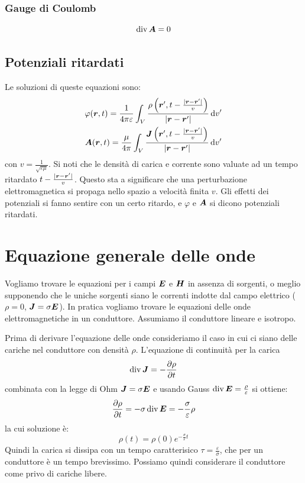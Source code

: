 \subsubsection{Gauge di Coulomb}
\begin{equation}
  \operatorname{div}\boldsymbol{A}=0
\end{equation}


\subsection{Potenziali ritardati}
Le soluzioni di queste equazioni sono:
\begin{gather}
  \varphi(\boldsymbol{r},t)=\frac{1}{4\pi\varepsilon}\int_V\frac{\rho\left(\boldsymbol{r}', t-\frac{|\boldsymbol{r}-\boldsymbol{r}'|}{v}\right)}{|\boldsymbol{r}-\boldsymbol{r}'|}\,\mathrm{d} v'\\
  \boldsymbol{A}(\boldsymbol{r},t)=\frac{\mu}{4\pi}\int_V\frac{\boldsymbol{J}\left(\boldsymbol{r}', t-\frac{|\boldsymbol{r}-\boldsymbol{r}'|}{v}\right)}{|\boldsymbol{r} - \boldsymbol{r}'|}\,\mathrm{d} v'
\end{gather}
con $v=\frac{1}{\sqrt{\varepsilon\mu}}$. Si noti che le densità di carica e corrente sono valuate ad un tempo ritardato $t-\frac{|\boldsymbol{r}-\boldsymbol{r}'|}{v}$. Questo sta a significare che una perturbazione elettromagnetica si propaga nello spazio a velocità finita $v$. Gli effetti dei potenziali si fanno sentire con un certo ritardo, e $\varphi$ e $\boldsymbol{A}$ si dicono potenziali ritardati.
\section{Equazione generale delle onde}
Vogliamo trovare le equazioni per i campi $\boldsymbol{E}$ e $\boldsymbol{H}$ in assenza di sorgenti, o meglio supponendo che le uniche sorgenti siano le correnti indotte dal campo elettrico ($\rho=0$, $\boldsymbol{J}=\sigma\boldsymbol{E}$). In pratica vogliamo trovare le equazioni delle onde elettromagnetiche in un conduttore. Assumiamo il conduttore lineare e isotropo.

Prima di derivare l'equazione delle onde consideriamo il caso in cui ci siano delle cariche nel conduttore con densità $\rho$. L'equazione di continuità per la carica
\[
\operatorname{div} \boldsymbol{J} = -\frac{\partial \rho}{\partial t}
\]
combinata con la legge di Ohm $\boldsymbol{J} = \sigma \boldsymbol{E}$ e usando Gauss $\operatorname{div} \boldsymbol{E} = \frac{\rho}{\varepsilon}$ si ottiene:
\[
\frac{\partial \rho}{\partial t} = -\sigma \operatorname{div}\boldsymbol{E} = -\frac{\sigma}{\varepsilon}\rho
\]
la cui soluzione è:
\[
\rho(t) = \rho(0)e^{-\frac{\sigma}{\varepsilon}t}
\]
Quindi la carica si dissipa con un tempo caratterisico $\tau = \frac{\varepsilon}{\sigma}$, che per un conduttore è un tempo brevissimo. Possiamo quindi considerare il conduttore come privo di cariche libere.

